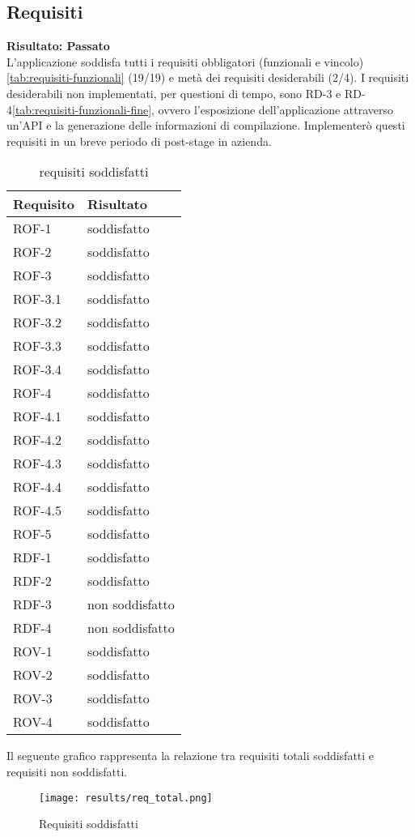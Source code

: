 \subsection{Requisiti} %
\textbf{Risultato: Passato}\\
L'applicazione soddisfa tutti i requisiti obbligatori (funzionali e vincolo)\ref{tab:requisiti-funzionali} (19/19) e metà dei requisiti desiderabili (2/4). I requisiti desiderabili non implementati, per questioni di tempo, sono RD-3 e RD-4\ref{tab:requisiti-funzionali-fine}, ovvero l'esposizione dell'applicazione attraverso un'API e la generazione delle informazioni di compilazione. Implementerò questi requisiti in un breve periodo di post-stage in azienda.
\label{tab:requisiti-resoconto}
\begin{longtable}{|l l|}
\caption{requisiti soddisfatti}\\
\hline
\textbf{Requisito} & \textbf{Risultato} \\
\hline
\endhead
ROF-1     & soddisfatto\\
ROF-2     & soddisfatto\\
ROF-3     & soddisfatto\\
ROF-3.1   & soddisfatto\\
ROF-3.2   & soddisfatto\\
ROF-3.3   & soddisfatto\\
ROF-3.4   & soddisfatto\\
ROF-4     & soddisfatto\\
ROF-4.1   & soddisfatto\\
ROF-4.2   & soddisfatto\\
ROF-4.3   & soddisfatto\\
ROF-4.4   & soddisfatto\\
ROF-4.5   & soddisfatto\\
ROF-5     & soddisfatto\\
RDF-1     & soddisfatto\\
RDF-2     & soddisfatto\\
RDF-3     & non soddisfatto\\
RDF-4     & non soddisfatto\\
ROV-1     & soddisfatto\\
ROV-2     & soddisfatto\\
ROV-3     & soddisfatto\\
ROV-4     & soddisfatto\\
\hline
\end{longtable}

Il seguente grafico rappresenta la relazione tra requisiti totali soddisfatti e requisiti non soddisfatti.
\begin{figure}[H]
    \centering
    \texttt{[image: results/req\_total.png]}
    \caption{Requisiti soddisfatti}
    \label{img:req_soddisfatti}
\end{figure}

